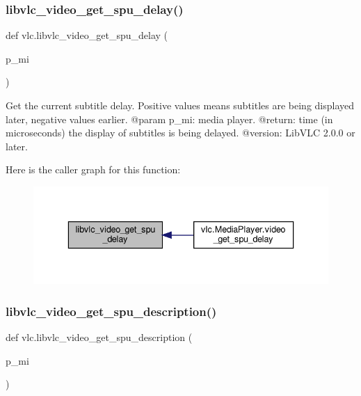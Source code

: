 \subsubsection{\texorpdfstring{libvlc\+\_\+video\+\_\+get\+\_\+spu\+\_\+delay()}{libvlc\_video\_get\_spu\_delay()}}
{\footnotesize\ttfamily def vlc.\+libvlc\+\_\+video\+\_\+get\+\_\+spu\+\_\+delay (\begin{DoxyParamCaption}\item[{}]{p\+\_\+mi }\end{DoxyParamCaption})}

\begin{DoxyVerb}Get the current subtitle delay. Positive values means subtitles are being
displayed later, negative values earlier.
@param p_mi: media player.
@return: time (in microseconds) the display of subtitles is being delayed.
@version: LibVLC 2.0.0 or later.
\end{DoxyVerb}
 Here is the caller graph for this function\+:
\nopagebreak
\begin{figure}[H]
\begin{center}
\leavevmode
\includegraphics[width=336pt]{namespacevlc_a1ea9c1d1ba99cac0cd71cb670c54d6f2_icgraph}
\end{center}
\end{figure}
\mbox{\label{namespacevlc_a4dee99f1b8023bb53f698403c94b2573}} 
\subsubsection{\texorpdfstring{libvlc\+\_\+video\+\_\+get\+\_\+spu\+\_\+description()}{libvlc\_video\_get\_spu\_description()}}
{\footnotesize\ttfamily def vlc.\+libvlc\+\_\+video\+\_\+get\+\_\+spu\+\_\+description (\begin{DoxyParamCaption}\item[{}]{p\+\_\+mi }\end{DoxyParamCaption})}

